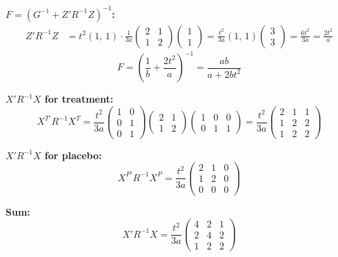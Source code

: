 \documentclass[11pt]{article}
\begin{document}
\textbf{$F = (G^{-1} + Z'R^{-1}Z)^{-1}$:}
\begin{align}
  Z'R^{-1}Z &= t^2 (1,\,1) \cdot \frac{1}{3a}
    \begin{pmatrix} 2&1\\1&2 \end{pmatrix}
    \begin{pmatrix} 1\\1 \end{pmatrix}
  = \frac{t^2}{3a}(1,\,1)\begin{pmatrix}3\\3\end{pmatrix}
  = \frac{6t^2}{3a}
  = \frac{2t^2}{a}
\end{align}
\begin{equation}
  \boxed{
    F = \left(\frac{1}{b}
      + \frac{2t^2}{a}\right)^{-1}
    = \frac{ab}{a + 2bt^2}
  }
\end{equation}

\textbf{$X'R^{-1}X$ for treatment:}
\begin{equation}
  X^{T\prime} R^{-1} X^T
  = \frac{t^2}{3a}\begin{pmatrix}
    1&0\\0&1\\0&1
  \end{pmatrix}
  \begin{pmatrix}2&1\\1&2\end{pmatrix}
  \begin{pmatrix}1&0&0\\0&1&1\end{pmatrix}
  = \frac{t^2}{3a}\begin{pmatrix}
    2 & 1 & 1 \\ 1 & 2 & 2 \\ 1 & 2 & 2
  \end{pmatrix}
\end{equation}

\textbf{$X'R^{-1}X$ for placebo:}
\begin{equation}
  X^{P\prime} R^{-1} X^P
  = \frac{t^2}{3a}\begin{pmatrix}
    2 & 1 & 0 \\ 1 & 2 & 0 \\ 0 & 0 & 0
  \end{pmatrix}
\end{equation}

\textbf{Sum:}
\begin{equation}
  X'R^{-1}X
  = \frac{t^2}{3a}\begin{pmatrix}
    4 & 2 & 1 \\ 2 & 4 & 2 \\ 1 & 2 & 2
  \end{pmatrix}
\end{equation}
\end{document}
